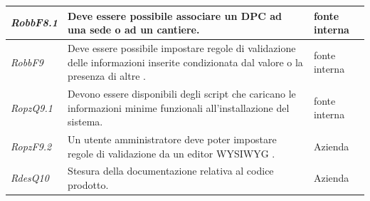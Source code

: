 \begin{flushleft}
\begin{tabular}{|l{2cm}|l{8cm}|l{2cm}|}
		\hline
		\label{RobbF8.1}
		\textit{RobbF8.1} & Deve essere possibile associare un \gls{DPC} ad una sede o ad un cantiere. & fonte interna\\
		\hline
		\label{RobbF9}
		\textit{RobbF9} & Deve essere possibile impostare regole di validazione delle informazioni inserite condizionata dal valore o la presenza di altre . & fonte interna\\
		\hline
		\label{RdesQ9.1}
		\textit{RopzQ9.1} & Devono essere disponibili degli script che caricano le informazioni minime funzionali all'installazione del sistema. & fonte interna\\
		\hline
		\label{RdesF9.2}
		\textit{RopzF9.2} & Un utente amministratore deve poter impostare regole di validazione da un editor \gls{WYSIWYG} . & Azienda \\
		\hline
		\label{RdesQ10}
		\textit{RdesQ10} & Stesura della documentazione relativa al codice prodotto. & Azienda \\
		\hline
	\end{tabular}
\end{flushleft}
